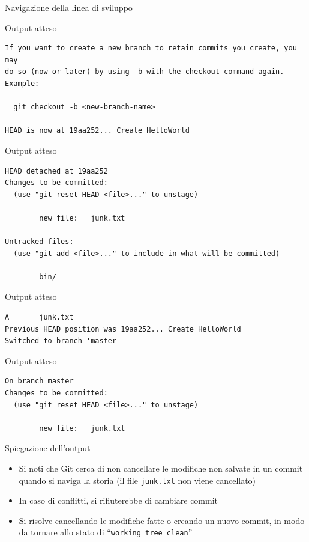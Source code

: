 \documentclass[presentation]{beamer}
\begin{document}
\begin{frame}{Navigazione della linea di sviluppo}
\begin{block}{Output atteso}
\begin{Verbatim}[fontsize=\scriptsize]
If you want to create a new branch to retain commits you create, you may
do so (now or later) by using -b with the checkout command again. Example:

  git checkout -b <new-branch-name>

HEAD is now at 19aa252... Create HelloWorld
		\end{Verbatim}
	\end{block}
	\begin{block}{Output atteso}
		\begin{Verbatim}[fontsize=\scriptsize]
HEAD detached at 19aa252
Changes to be committed:
  (use "git reset HEAD <file>..." to unstage)

        new file:   junk.txt

Untracked files:
  (use "git add <file>..." to include in what will be committed)

        bin/

		\end{Verbatim}
	\end{block}
	\begin{block}{Output atteso}
		\begin{Verbatim}[fontsize=\scriptsize]
A       junk.txt
Previous HEAD position was 19aa252... Create HelloWorld
Switched to branch 'master
		\end{Verbatim}
	\end{block}
	\begin{block}{Output atteso}
		\begin{Verbatim}[fontsize=\scriptsize]
On branch master
Changes to be committed:
  (use "git reset HEAD <file>..." to unstage)

        new file:   junk.txt

		\end{Verbatim}
	\end{block}
	\begin{block}{Spiegazione dell'output}
		\begin{itemize}
			\item Si noti che Git cerca di non cancellare le modifiche non salvate in un commit quando si naviga la storia (il file \texttt{junk.txt} non viene cancellato)
			\item In caso di conflitti, si rifiuterebbe di cambiare commit
			\item Si risolve cancellando le modifiche fatte o creando un nuovo commit, in modo da tornare allo stato di ``\texttt{working tree clean}''
		\end{itemize}
	\end{block}
\end{frame}
\end{document}
